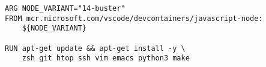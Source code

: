 
\begin{lstlisting}[language=docker, frame=single, caption={NodeJS DevContainer Dockerfile},label=code::docker_dev_node]
ARG NODE_VARIANT="14-buster"
FROM mcr.microsoft.com/vscode/devcontainers/javascript-node:
    ${NODE_VARIANT}

RUN apt-get update && apt-get install -y \
    zsh git htop ssh vim emacs python3 make
\end{lstlisting}
